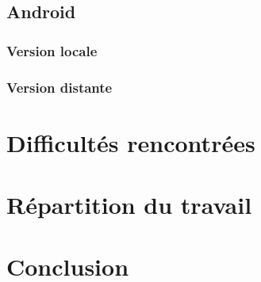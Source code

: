 \documentclass[12pt,a4paper,oneside]{article}
\begin{document}
\newpage

\subsection{Android}
\subsubsection{Version locale}
\subsubsection{Version distante}


\section{Difficultés rencontrées}


\section{Répartition du travail}


\section{Conclusion}


\appendix
\end{document}
